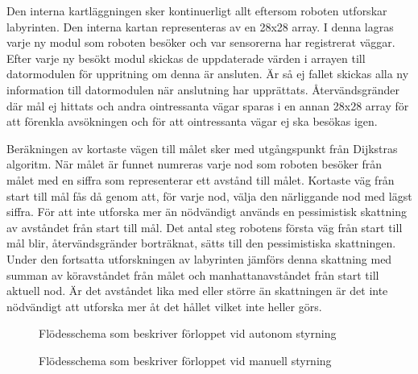\documentclass[11pt]{article}
\begin{document}
\begin{flushleft}
Den interna kartläggningen sker kontinuerligt allt eftersom roboten utforskar labyrinten. Den interna kartan representeras av en 28x28 array. I denna lagras varje ny modul som roboten besöker och var sensorerna har registrerat väggar. Efter varje ny besökt modul skickas de uppdaterade värden i arrayen till datormodulen för uppritning om denna är ansluten. Är så ej fallet skickas alla ny information till datormodulen när anslutning har upprättats. Återvändsgränder där mål ej hittats och andra ointressanta vägar sparas i en annan 28x28 array för att förenkla avsökningen och för att ointressanta vägar ej ska besökas igen.

Beräkningen av kortaste vägen till målet sker med utgångspunkt från Dijkstras algoritm. När målet är funnet numreras varje nod som roboten besöker från målet  med en siffra som representerar ett avstånd till målet. Kortaste väg från start till mål fås då genom att, för varje nod, välja den närliggande nod med lägst siffra. För att inte utforska mer än nödvändigt används en pessimistisk skattning av avståndet från start till mål. Det antal steg robotens första väg från start till mål blir, återvändsgränder borträknat, sätts till den pessimistiska skattningen. Under den fortsatta utforskningen av labyrinten jämförs denna skattning med summan av köravståndet från målet  och manhattanavståndet från start till aktuell nod. Är det avståndet lika med eller större än skattningen är det inte nödvändigt att utforska mer åt det hållet vilket inte heller görs.

\begin{figure}[htbp]
\centering
\noindent\resizebox{0.9\linewidth}{!}{
	}
	\cprotect\caption{Flödesschema som beskriver förloppet vid autonom styrning \label{autonomousMode}}	
\end{figure}

\begin{figure}[htbp]
\centering
\noindent\resizebox{0.9\linewidth}{!}{
	}
	\cprotect\caption{Flödesschema som beskriver förloppet vid manuell styrning \label{manualMode}}	
\end{figure}

\pagebreak


\end{flushleft}
\end{document}
